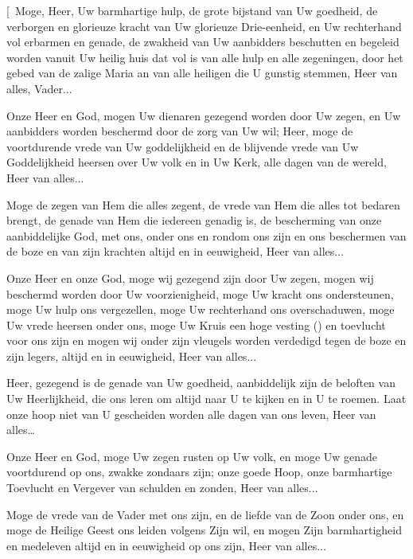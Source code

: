 \documentclass[12pt,twoside,a5paper]{article}
\begin{document}
\begin{halfparskip}
  [\cc~Moge, Heer, Uw barmhartige hulp, de grote bijstand van Uw goedheid, de verborgen en glorieuze kracht van Uw glorieuze Drie-eenheid, en Uw rechterhand vol erbarmen en genade, de zwakheid van Uw aanbidders beschutten en begeleid worden vanuit Uw heilig huis dat vol is van alle hulp en alle zegeningen, door het gebed van de zalige Maria an van alle heiligen die U gunstig stemmen, Heer van alles, Vader...

   Onze Heer en God, mogen Uw dienaren gezegend worden door Uw zegen, en Uw aanbidders worden beschermd door de zorg van Uw wil; Heer, moge de voortdurende vrede van Uw goddelijkheid en de blijvende vrede van Uw Goddelijkheid heersen over Uw volk en in Uw Kerk, alle dagen van de wereld, Heer van alles...

   Moge de zegen van Hem die alles zegent, de vrede van Hem die alles tot bedaren brengt, de genade van Hem die iedereen genadig is, de bescherming van onze aanbiddelijke God, met ons, onder ons en rondom ons zijn en ons beschermen van de boze en van zijn krachten altijd en in eeuwigheid, Heer van alles...

   Onze Heer en onze God, moge wij gezegend zijn door Uw zegen, mogen wij beschermd worden door Uw voorzienigheid, moge Uw kracht ons ondersteunen, moge Uw hulp ons vergezellen, moge Uw rechterhand ons overschaduwen, moge Uw vrede heersen onder ons, moge Uw Kruis een hoge vesting () en toevlucht voor ons zijn en mogen wij onder zijn vleugels worden verdedigd tegen de boze en zijn legers, altijd en in eeuwigheid, Heer van alles...

   Heer, gezegend is de genade van Uw goedheid, aanbiddelijk zijn de beloften van Uw Heerlijkheid, die ons leren om altijd naar U te kijken en in U te roemen. Laat onze hoop niet van U gescheiden worden alle dagen van ons leven, Heer van alles…

   Onze Heer en God, moge Uw zegen rusten op Uw volk, en moge Uw genade voortdurend op ons, zwakke zondaars zijn; onze goede Hoop, onze barmhartige Toevlucht en Vergever van schulden en zonden, Heer van alles...

   Moge de vrede van de Vader met ons zijn, en de liefde van de Zoon onder ons, en moge de Heilige Geest ons leiden volgens Zijn wil, en mogen Zijn barmhartigheid en medeleven altijd en in eeuwigheid op ons zijn, Heer van alles...


\end{halfparskip}
\end{document}
